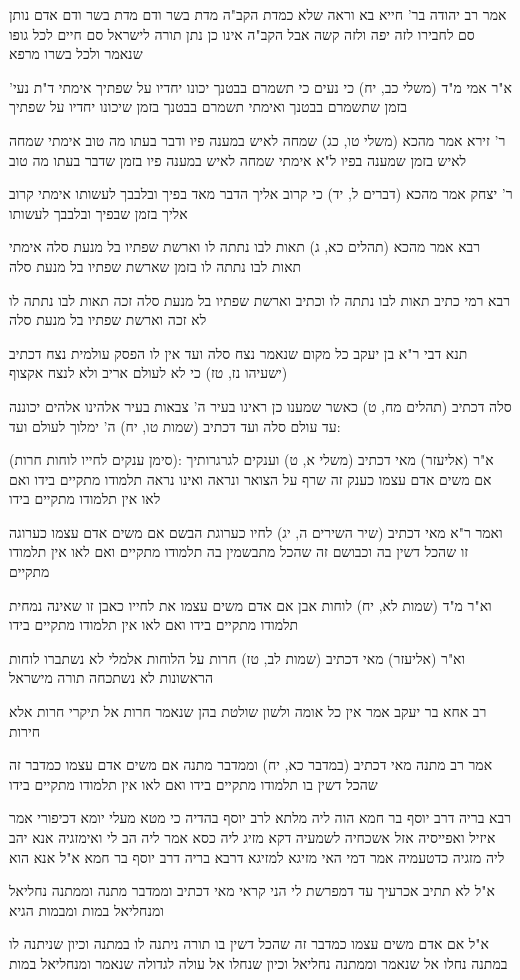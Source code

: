 \documentclass[12pt, openany]{book}
\newcommand{\sethebfont}{
\fontsize{10.5pt}{21.0pt} \selectfont
}
\newcommand{\textblock}[1]{
{\sethebfont #1\\}	
}
\begin{document}
\textblock{אמר רב יהודה בר' חייא בא וראה שלא כמדת הקב"ה מדת בשר ודם מדת בשר ודם אדם נותן סם לחבירו לזה יפה ולזה קשה אבל הקב"ה אינו כן נתן תורה לישראל סם חיים לכל גופו שנאמר ולכל בשרו מרפא}
\textblock{א"ר אמי מ"ד (משלי כב, יח) כי נעים כי תשמרם בבטנך יכונו יחדיו על שפתיך אימתי ד"ת נעי' בזמן שתשמרם בבטנך ואימתי תשמרם בבטנך בזמן שיכונו יחדיו על שפתיך}
\textblock{ר' זירא אמר מהכא (משלי טו, כג) שמחה לאיש במענה פיו ודבר בעתו מה טוב אימתי שמחה לאיש בזמן שמענה בפיו ל"א אימתי שמחה לאיש במענה פיו בזמן שדבר בעתו מה טוב}
\textblock{ר' יצחק אמר מהכא (דברים ל, יד) כי קרוב אליך הדבר מאד בפיך ובלבבך לעשותו אימתי קרוב אליך בזמן שבפיך ובלבבך לעשותו}
\textblock{רבא אמר מהכא (תהלים כא, ג) תאות לבו נתתה לו וארשת שפתיו בל מנעת סלה אימתי תאות לבו נתתה לו בזמן שארשת שפתיו בל מנעת סלה}
\textblock{רבא רמי כתיב תאות לבו נתתה לו וכתיב וארשת שפתיו בל מנעת סלה זכה תאות לבו נתתה לו לא זכה וארשת שפתיו בל מנעת סלה}
\textblock{תנא דבי ר"א בן יעקב כל מקום שנאמר נצח סלה ועד אין לו הפסק עולמית נצח דכתיב (ישעיהו נז, טז) כי לא לעולם אריב ולא לנצח אקצוף}
\textblock{סלה דכתיב (תהלים מח, ט) כאשר שמענו כן ראינו בעיר ה' צבאות בעיר אלהינו אלהים יכוננה עד עולם סלה ועד דכתיב (שמות טו, יח) ה' ימלוך לעולם ועד:}
\textblock{(סימן ענקים לחייו לוחות חרות): א"ר (אליעזר) מאי דכתיב (משלי א, ט) וענקים לגרגרותיך אם משים אדם עצמו כענק זה שרף על הצואר ונראה ואינו נראה תלמודו מתקיים בידו ואם לאו אין תלמודו מתקיים בידו}
\textblock{ואמר ר"א מאי דכתיב (שיר השירים ה, יג) לחיו כערוגת הבשם אם משים אדם עצמו כערוגה זו שהכל דשין בה וכבושם זה שהכל מתבשמין בה תלמודו מתקיים ואם לאו אין תלמודו מתקיים}
\textblock{וא"ר מ"ד (שמות לא, יח) לוחות אבן אם אדם משים עצמו את לחייו כאבן זו שאינה נמחית תלמודו מתקיים בידו ואם לאו אין תלמודו מתקיים בידו}
\textblock{וא"ר (אליעזר) מאי דכתיב (שמות לב, טז) חרות על הלוחות אלמלי לא נשתברו לוחות הראשונות לא נשתכחה תורה מישראל}
\textblock{רב אחא בר יעקב אמר אין כל אומה ולשון שולטת בהן שנאמר חרות אל תיקרי חרות אלא חירות}
\textblock{אמר רב מתנה מאי דכתיב (במדבר כא, יח) וממדבר מתנה אם משים אדם עצמו כמדבר זה שהכל דשין בו תלמודו מתקיים בידו ואם לאו אין תלמודו מתקיים בידו}
\textblock{רבא בריה דרב יוסף בר חמא הוה ליה מלתא לרב יוסף בהדיה כי מטא מעלי יומא דכיפורי אמר איזיל ואפייסיה אזל אשכחיה לשמעיה דקא מזיג ליה כסא אמר ליה הב לי ואימזגיה אנא יהב ליה מזגיה כדטעמיה אמר דמי האי מזיגא למזיגא דרבא בריה דרב יוסף בר חמא א"ל אנא הוא}
\textblock{א"ל לא תתיב אכרעיך עד דמפרשת לי הני קראי מאי דכתיב וממדבר מתנה וממתנה נחליאל ומנחליאל במות ומבמות הגיא}
\textblock{א"ל אם אדם משים עצמו כמדבר זה שהכל דשין בו תורה ניתנה לו במתנה וכיון שניתנה לו במתנה נחלו אל שנאמר וממתנה נחליאל וכיון שנחלו אל עולה לגדולה שנאמר ומנחליאל במות}
\end{document}
